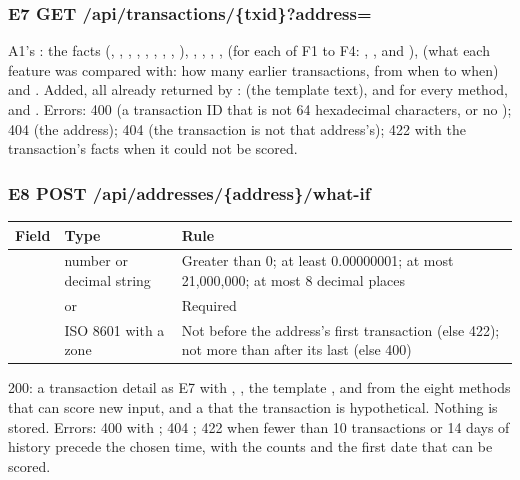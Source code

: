 \subsubsection*{E7 \quad GET /api/transactions/\{txid\}?address=}
A1's : the facts (, , ,
, , , , ,
), , , , , 
(for each of F1 to F4: , ,  and ), 
(what each feature was compared with: how many earlier transactions, from when to when) and
. Added, all already returned by :  (the
template text),  and  for every method, and . Errors: 400
(a transaction ID that is not 64 hexadecimal characters, or no ); 404
 (the address); 404  (the transaction is not that address's);
422  with the transaction's facts when it could not be scored.

\subsubsection*{E8 \quad POST /api/addresses/\{address\}/what-if}
\label{sec:e8}
\begin{center}
\small
\begin{tabularx}{\textwidth}{@{}L{2.2cm}L{3.1cm}Y@{}}
\toprule
\textbf{Field} & \textbf{Type} & \textbf{Rule} \\
\midrule
{} & number or decimal string & Greater than 0; at least 0.00000001; at most 21,000,000; at most 8 decimal places \\
 &  or  & Required \\
 & ISO 8601 with a zone & Not before the address's first transaction (else 422); not more than  after its last (else 400) \\
\bottomrule
\end{tabularx}
\end{center}
200: a transaction detail as E7 with , , the template
,  and  from the eight methods that can score new input,
 and a  that the transaction is hypothetical.
Nothing is stored. Errors: 400  with ; 404 ; 422
 when fewer than 10 transactions or 14 days of history precede the
chosen time, with the counts and the first date that can be scored.

